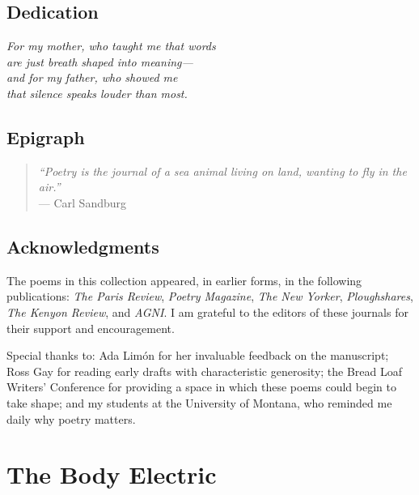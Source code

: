 \documentclass[
    language=english,
    doctype=poetry-collection,
    institution=none,
]{../../omnilatex}
\begin{document}
\maketitle

\frontmatter

\chapter*{Dedication}

\noindent\textit{For my mother, who taught me that words\\
are just breath shaped into meaning---\\
and for my father, who showed me\\
that silence speaks louder than most.}

\chapter*{Epigraph}

\begin{quote}
\textit{``Poetry is the journal of a sea animal living on land, wanting to fly in the air.''}\\
--- Carl Sandburg
\end{quote}

\chapter*{Acknowledgments}

The poems in this collection appeared, in earlier forms, in the following publications: \textit{The Paris Review}, \textit{Poetry Magazine}, \textit{The New Yorker}, \textit{Ploughshares}, \textit{The Kenyon Review}, and \textit{AGNI}. I am grateful to the editors of these journals for their support and encouragement.

Special thanks to: Ada Lim\'{o}n for her invaluable feedback on the manuscript; Ross Gay for reading early drafts with characteristic generosity; the Bread Loaf Writers' Conference for providing a space in which these poems could begin to take shape; and my students at the University of Montana, who reminded me daily why poetry matters.

\tableofcontents

\mainmatter

\part{The Body Electric}
\end{document}
